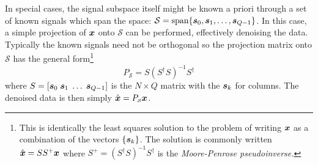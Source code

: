 \documentclass[twocolumn]{gwclass}
\begin{document}
In special cases, the signal subspace itself might be known a priori through a set of known signals which span the space: $\mathcal{S}=\text{\normalfont{span}}\{\boldsymbol{s}_0, \boldsymbol{s}_1,\dots,\boldsymbol{s}_{Q-1}\}$. In this case, a simple projection of $\boldsymbol{x}$ onto $\mathcal{S}$ can be performed, effectively denoising the data. Typically the known signals need not be orthogonal so the projection matrix onto $\mathcal{S}$ has the general form\footnote{This is identically the least squares solution to the problem of writing $\boldsymbol{x}$ as a combination of the vectors $\{\boldsymbol{s}_k\}$. The solution is commonly written $\hat{\boldsymbol{x}}=SS^+\boldsymbol{x}$ where $S^+=(S^\dagger S)^{-1}S^\dagger$ is the \emph{Moore-Penrose pseudoinverse.}} 
$$P_{\scriptscriptstyle\mathcal{S}}=S(S^\dagger S)^{-1}S^\dagger$$ 
where $S=[\boldsymbol{s}_0\;\boldsymbol{s}_1\;\dots\;\boldsymbol{s}_{Q-1}]$ is the $N\times Q$ matrix with the $\boldsymbol{s}_k$ for columns. The denoised data is then simply $\hat{\boldsymbol{x}}=P_{\scriptscriptstyle\mathcal{S}}\boldsymbol{x}$.
\end{document}
